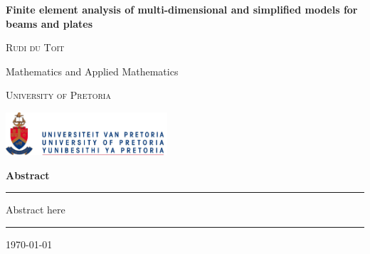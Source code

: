 \begin{titlepage}
    \centering
    \vfill %
    {\Huge\bfseries Finite element analysis of multi-dimensional and simplified models for beams and plates\par}
    \vspace{1.5cm} %
    {\Large\scshape Rudi du Toit\par} %
    \vspace{1cm}
    Mathematics and Applied Mathematics\par
    \vspace{1cm}
    {\large\scshape University of Pretoria\par} %
    \vspace{0.5cm}
    \includegraphics[width=6cm]{images/logo-up.jpg}\par
    \vspace{1cm}
    {\LARGE\bfseries Abstract\par}
    \vspace{0.5cm}
    \hrule
    \vspace{0.5cm}
    \begin{minipage}{0.9\textwidth}
      Abstract here
    \end{minipage}
    \vspace{0.5cm}
    \hrule
    \vfill %
    \large \today
\end{titlepage}
